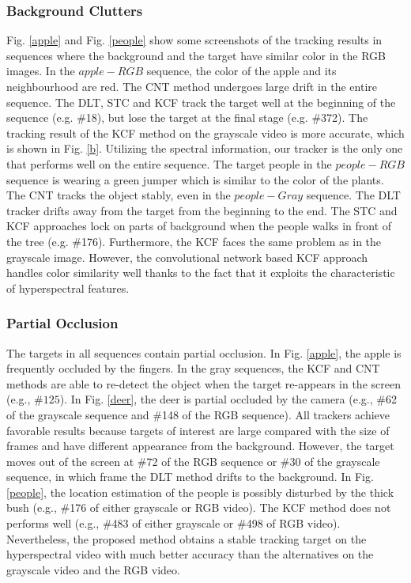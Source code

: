 \documentclass[runningheads,a4paper]{llncs}
\begin{document}
\subsubsection{Background Clutters}
Fig. \ref{apple} and Fig. \ref{people} show some screenshots of the tracking results in sequences where the background and the target have similar color in the RGB images. In the $apple-RGB$ sequence, the color of the apple and its neighbourhood are red. The CNT method undergoes large drift in the entire sequence. The DLT, STC and KCF track the target well at the beginning of the sequence (e.g. $\#$18), but lose the target at the final stage (e.g. $\#$372). The tracking result of the KCF method on the grayscale video is more accurate, which is shown in Fig. \ref{b}. Utilizing the spectral information, our tracker is the only one that performs well on the entire sequence. The target people in the $people-RGB$ sequence is wearing a green jumper which is similar to the color of the plants. The CNT tracks the object stably, even in the $people-Gray$ sequence. The DLT tracker drifts away from the target from the beginning to the end. The STC and KCF approaches lock on parts of background when the people walks in front of the tree (e.g. $\#$176). Furthermore, the KCF faces the same problem as in the grayscale image. However, the convolutional network based KCF approach handles color similarity well thanks to the fact that it exploits the characteristic of hyperspectral features.

\subsubsection{Partial Occlusion}
The targets in all sequences contain partial occlusion. In Fig. \ref{apple}, the apple is frequently occluded by the fingers. In the gray sequences, the KCF and CNT methods are able to re-detect the object when the target re-appears in the screen (e.g., $\#125$).  In Fig. \ref{deer}, the deer is partial occluded by the camera (e.g., $\#$62 of the grayscale sequence and $\#$148 of the RGB sequence). All trackers achieve favorable results because targets of interest are large compared with the size of frames and have different appearance from the background. However, the target moves out of the screen at $\#$72 of the RGB sequence or $\#$30 of the grayscale sequence, in which frame the DLT method drifts to the background. In Fig. \ref{people}, the location estimation of the people is possibly disturbed by the thick bush (e.g., $\#$176 of either grayscale or RGB video). The KCF method does not performs well (e.g., $\#$483 of either grayscale or $\#$498 of RGB video). Nevertheless, the proposed method obtains a stable tracking target on the hyperspectral video with much better accuracy than the alternatives on the grayscale video and the RGB video.
\end{document}
